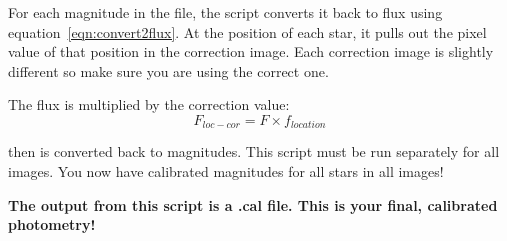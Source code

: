 \documentclass[11pt]{article}
\begin{document}
For each magnitude in the file, the script converts it back to flux using equation~\ref{eqn:convert2flux}.
At the position of each star, it pulls out the pixel value of that position in the correction image. Each correction image is slightly different so make sure you are using the correct one.

The flux is multiplied by the correction value:
\begin{equation}
F_{loc-cor} = {F} \times {f_{location}}
\end{equation}
\label{eqn:location}

then is converted back to magnitudes. This script must be run separately for all images. You now have calibrated magnitudes for all stars in all images!

{\bf The output from this script is a .cal file. This is your final, calibrated photometry!}



\end{document}
